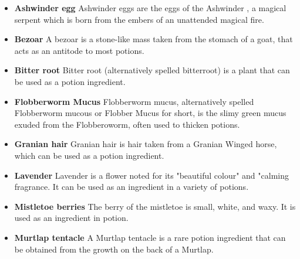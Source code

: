 \begin{itemize}
 \item \textbf {Ashwinder egg}
 Ashwinder eggs are the eggs of the Ashwinder , a magical serpent  which is born from the embers of an unattended magical fire.

 \item \textbf {Bezoar}
A bezoar is a stone-like mass taken from the stomach of a goat, that acts as an antitode to most potions.

 \item \textbf {Bitter root}
Bitter root (alternatively spelled bitterroot) is a plant that can be used as a potion ingredient.

 \item \textbf {Flobberworm Mucus}
  Flobberworm mucus, alternatively spelled Flobberworm mucous or Flobber Mucus for short, is the slimy green mucus exuded from the Flobberoworm, often used to thicken potions.


 \item \textbf {Granian hair}
  Granian hair is hair taken from a Granian Winged horse, which can be used as a potion ingredient.

 \item \textbf {Lavender}
Lavender is a flower noted for its "beautiful colour" and "calming fragrance. It can be used as an ingredient in a variety of potions.

 \item \textbf {Mistletoe berries}
The berry of the mistletoe is small, white, and waxy. It is used as an ingredient in potion.

 \item \textbf {Murtlap tentacle}
A Murtlap tentacle is a rare potion ingredient that can be obtained from the growth on the back of a Murtlap.


\end{itemize}
